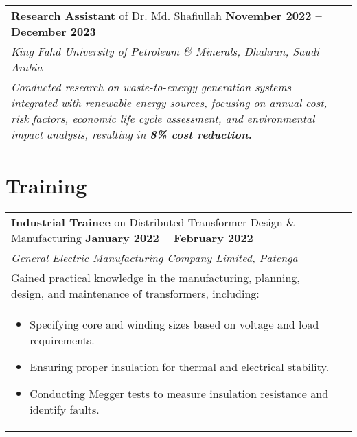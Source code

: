 \documentclass[a4paper,11pt]{article}
\begin{document}

\begin{tabularx}{\linewidth}{@{}L @{}R}
\textbf{Research Assistant} of Dr. Md. Shafiullah \hfill \textbf{November 2022 -- December 2023} \\[2pt]
\emph{King Fahd University of Petroleum \& Minerals, Dhahran, Saudi Arabia}\\[4pt]
\textit{Conducted research on waste-to-energy generation systems integrated with renewable energy sources, focusing on annual cost, risk factors, economic life cycle assessment, and environmental impact analysis, resulting in \textbf{8\% cost reduction.}} 
\end{tabularx}

\vspace{2mm}


\section{Training}
\begin{tabularx}{\linewidth}{ @{}l r@{} }
\textbf{Industrial Trainee} on Distributed Transformer Design \& Manufacturing \hfill \textbf{January 2022 -- February 2022}\\[4pt]
\emph{General Electric Manufacturing Company Limited, Patenga} \\[4pt]
Gained practical knowledge in the manufacturing, planning, design, and maintenance of transformers, including:\\[4pt]
\begin{minipage}[t]{\linewidth}
    \begin{itemize}[nosep,after=\strut, leftmargin=1em, itemsep=2pt]
        \item Specifying core and winding sizes based on voltage and load requirements.
        \item Ensuring proper insulation for thermal and electrical stability.
        \item Conducting Megger tests to measure insulation resistance and identify faults.
    \end{itemize}
\end{minipage}
\end{tabularx}
\vspace{2mm}

 




\end{document}
